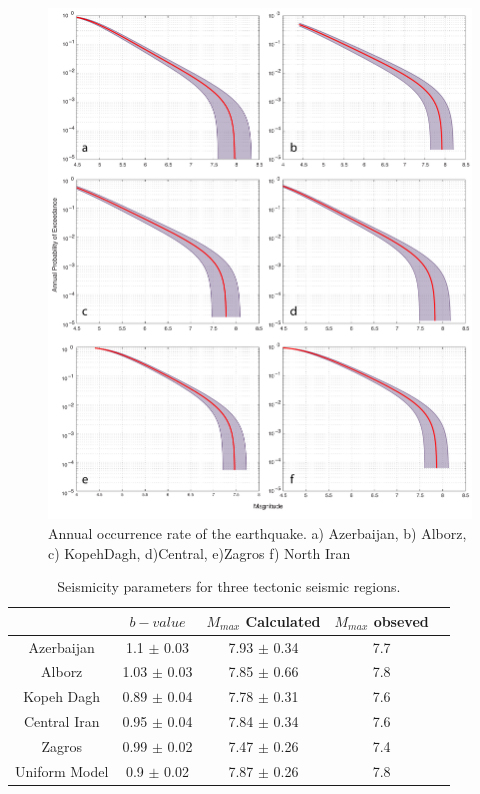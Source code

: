 \begin{figure} [!ht]
\centering
\includegraphics[scale=0.4]{figures/pdf/annual_rate_m.pdf} 
\caption{Annual occurrence rate of the earthquake. a) Azerbaijan, b) Alborz, c) KopehDagh, d)Central, e)Zagros f) North Iran}
\label{fig:annual_m}
\end{figure}




\noindent


\begin{table}[!ht]
\centering
\caption{Seismicity parameters for three tectonic seismic regions.}
    \begin{tabular}{ccccc}
    ~                          &         $b-value$     &   $M_{max} $  Calculated & $M_{max}$ obseved \\ \hline
    Azerbaijan           & 1.1   $\pm$ 0.03   &   7.93  $\pm$  0.34           &   7.7      			    \\ \hline
    Alborz                  &1.03  $\pm$ 0.03   &   7.85  $\pm$  0.66           &   7.8          	            \\ \hline
    Kopeh Dagh        & 0.89 $\pm$ 0.04   &   7.78  $\pm$  0.31           &   7.6          	            \\ \hline
    Central Iran         & 0.95 $\pm$ 0.04   &   7.84  $\pm$  0.34           &   7.6                           \\ \hline
    Zagros                 & 0.99 $\pm$ 0.02  &   7.47  $\pm$  0.26            &  7.4                            \\ \hline
    Uniform Model    & 0.9    $\pm$ 0.02  &   7.87  $\pm$  0.26            &  7.8                            \\ 
    \end{tabular}
 \label{tab:b_value} 
\end{table}


